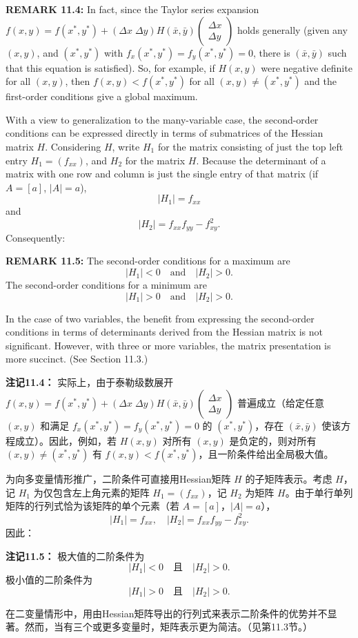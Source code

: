 \begin{original}
\textbf{REMARK 11.4:} In fact, since the Taylor series expansion $f(x, y) = f(x^*, y^*) + (\Delta x\; \Delta y) H(\bar{x}, \bar{y}) \begin{pmatrix} \Delta x \\ \Delta y \end{pmatrix}$ holds generally (given any $(x, y)$, and $(x^*, y^*)$ with $f_x(x^*, y^*) = f_y(x^*, y^*) = 0$, there is $(\bar{x}, \bar{y})$ such that this equation is satisfied). So, for example, if $H(x, y)$ were negative definite for all $(x, y)$, then $f(x, y) < f(x^*, y^*)$ for all $(x, y) \neq (x^*, y^*)$ and the first-order conditions give a global maximum.

With a view to generalization to the many-variable case, the second-order conditions can be expressed directly in terms of submatrices of the Hessian matrix $H$. Considering $H$, write $H_1$ for the matrix consisting of just the top left entry $H_1 = (f_{xx})$, and $H_2$ for the matrix $H$. Because the determinant of a matrix with one row and column is just the single entry of that matrix (if $A = [a]$, $|A| = a$),
\[
|H_1| = f_{xx}
\]
and
\[
|H_2| = f_{xx}f_{yy} - f_{xy}^2.
\]
Consequently:

\textbf{REMARK 11.5:} The second-order conditions for a maximum are
\[
|H_1| < 0 \quad\text{and}\quad |H_2| > 0.
\]
The second-order conditions for a minimum are
\[
|H_1| > 0 \quad\text{and}\quad |H_2| > 0.
\]

In the case of two variables, the benefit from expressing the second-order conditions in terms of determinants derived from the Hessian matrix is not significant. However, with three or more variables, the matrix presentation is more succinct. (See Section 11.3.)
\end{original}
\begin{translation}
\textbf{注记11.4：} 实际上，由于泰勒级数展开 $f(x, y) = f(x^*, y^*) + (\Delta x\; \Delta y) H(\bar{x}, \bar{y}) \begin{pmatrix} \Delta x \\ \Delta y \end{pmatrix}$ 普遍成立（给定任意 $(x, y)$ 和满足 $f_x(x^*, y^*) = f_y(x^*, y^*) = 0$ 的 $(x^*, y^*)$，存在 $(\bar{x}, \bar{y})$ 使该方程成立）。因此，例如，若 $H(x, y)$ 对所有 $(x, y)$ 是负定的，则对所有 $(x, y) \neq (x^*, y^*)$ 有 $f(x, y) < f(x^*, y^*)$，且一阶条件给出全局极大值。

为向多变量情形推广，二阶条件可直接用Hessian矩阵 $H$ 的子矩阵表示。考虑 $H$，记 $H_1$ 为仅包含左上角元素的矩阵 $H_1 = (f_{xx})$，记 $H_2$ 为矩阵 $H$。由于单行单列矩阵的行列式恰为该矩阵的单个元素（若 $A = [a]$，$|A| = a$），
\[
|H_1| = f_{xx}, \quad |H_2| = f_{xx}f_{yy} - f_{xy}^2.
\]
因此：

\textbf{注记11.5：} 极大值的二阶条件为
\[
|H_1| < 0 \quad\text{且}\quad |H_2| > 0.
\]
极小值的二阶条件为
\[
|H_1| > 0 \quad\text{且}\quad |H_2| > 0.
\]

在二变量情形中，用由Hessian矩阵导出的行列式来表示二阶条件的优势并不显著。然而，当有三个或更多变量时，矩阵表示更为简洁。（见第11.3节。）
\end{translation}

